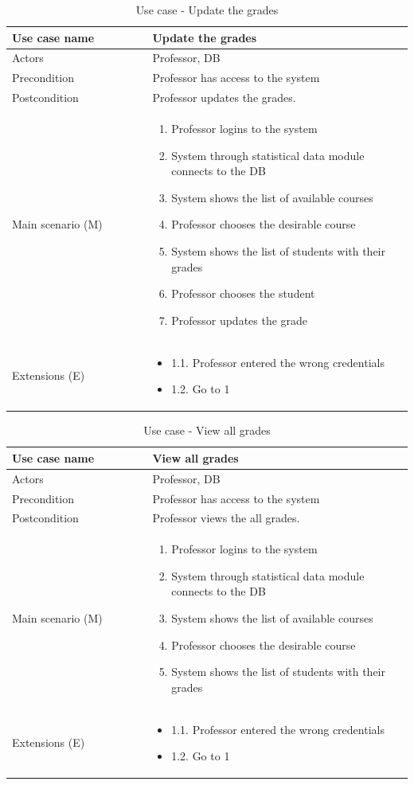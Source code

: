 \documentclass[12pt]{article}
\newcommand\tabularhead[1]{
\begin{table}[h]
  \caption{Use case - #1}
  \begin{tabular}{|p{0.35\linewidth}|p{0.65\linewidth}|}
    \hline
    \textbf{Use case name} & \textbf{#1} \\
    \hline}
\newcommand\addrow[2]{#1 &#2\\ \hline}
\newcommand\adddoublerow[2]{\begin{minipage}[t][][t]{2.5cm}#1\end{minipage}%
    &\begin{minipage}[t][][t]{\linewidth}
     \begin{itemize}\setlength{\itemsep}{0pt}%
        #2     
     \end{itemize}
     \end{minipage}\\ \hline}
\newcommand\addmulrow[2]{ \begin{minipage}[t][][t]{2.5cm}#1\end{minipage}%
     &\begin{minipage}[t][][t]{\linewidth}
      \begin{enumerate}\setlength{\itemsep}{0pt}%
        #2   
      \end{enumerate}
      \end{minipage}\\ \hline}
\newenvironment{usecase}{\tabularhead}
{\hline\end{tabular}\end{table}}
\begin{document}
\begin{usecase}{Update the grades}
    \addrow{Actors}{Professor, DB}
    \addrow{Precondition}{Professor has access to the system}
    \addrow{Postcondition}{Professor updates the grades.}
    \addmulrow{Main scenario (M)}{
        \item Professor logins to the system
        \item System through statistical data module connects to the DB
        \item System shows the list of available courses
        \item Professor chooses the desirable course
        \item System shows the list of students with their grades
        \item Professor chooses the student
        \item Professor updates the grade
    }
    \adddoublerow{Extensions (E)}{
        \item[] 1.1. Professor entered the wrong credentials
        \item[] 1.2. Go to 1
    }
\end{usecase}
\newpage
\begin{usecase}{View all grades}
    \addrow{Actors}{Professor, DB}
    \addrow{Precondition}{Professor has access to the system}
    \addrow{Postcondition}{Professor views the all grades.}
    \addmulrow{Main scenario (M)}{
        \item Professor logins to the system
        \item System through statistical data module connects to the DB
        \item System shows the list of available courses
        \item Professor chooses the desirable course
        \item System shows the list of students with their grades
    }
    \adddoublerow{Extensions (E)}{
        \item[] 1.1. Professor entered the wrong credentials
        \item[] 1.2. Go to 1
    }
\end{usecase}
\end{document}
